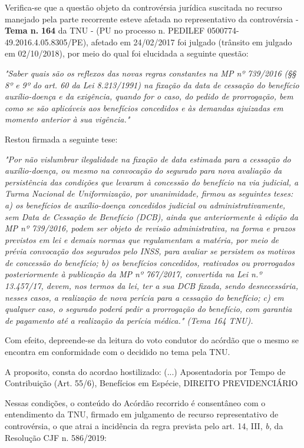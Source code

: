 \documentclass[12pt]{article}
\begin{document}
\justifying
\noindent Verifica-se que a questão objeto da controvérsia jurídica suscitada no recurso manejado pela parte recorrente esteve afetada no representativo da controvérsia - \textbf{Tema n. }\textbf{164} da TNU - (PU no processo n. PEDILEF 0500774-49.2016.4.05.8305/PE),  afetado em 24/02/2017 foi julgado (trânsito em julgado em 02/10/2018), por meio do qual foi elucidada a seguinte questão:

\noindent \textit{"Saber quais são os reflexos das novas regras constantes na MP nº 739/2016 (§§ 8º e 9º do art. 60 da Lei 8.213/1991) na fixação da data de cessação do benefício auxílio-doença e da exigência, quando for o caso, do pedido de prorrogação, bem como se são aplicáveis aos benefícios concedidos e às demandas ajuizadas em momento anterior à sua vigência."}

\noindent Restou firmada a seguinte tese:

\noindent \textit{"Por não vislumbrar ilegalidade na fixação de data estimada para a cessação do auxílio-doença, ou mesmo na convocação do segurado para nova avaliação da persistência das condições que levaram à concessão do benefício na via judicial, a Turma Nacional de Uniformização, por unanimidade, firmou as seguintes teses: a) os benefícios de auxílio-doença concedidos judicial ou administrativamente, sem Data de Cessação de Benefício (DCB), ainda que anteriormente à edição da MP nº 739/2016, podem ser objeto de revisão administrativa, na forma e prazos previstos em lei e demais normas que regulamentam a matéria, por meio de prévia convocação dos segurados pelo INSS, para avaliar se persistem os motivos de concessão do benefício; b) os benefícios concedidos, reativados ou prorrogados posteriormente à publicação da MP nº 767/2017, convertida na Lei n.º 13.457/17, devem, nos termos da lei, ter a sua DCB fixada, sendo desnecessária, nesses casos, a realização de nova perícia para a cessação do benefício; c) em qualquer caso, o segurado poderá pedir a prorrogação do benefício, com garantia de pagamento até a realização da perícia médica." (Tema 164 TNU).}

\noindent Com efeito, depreende-se da leitura do voto condutor do acórdão que o mesmo se encontra em conformidade com o decidido no  tema pela TNU.

\noindent A proposito, consta do acordao hostilizado: (...) Aposentadoria por Tempo de Contribuição (Art. 55/6), Benefícios em Espécie, DIREITO PREVIDENCIÁRIO

\noindent Nessas condições, o conteúdo do Acórdão recorrido é consentâneo com o entendimento da TNU, firmado em julgamento de recurso representativo de controvérsia, o que atrai a incidência da regra prevista pelo art. 14, III, \textit{b,} da Resolução CJF n. 586/2019:
\end{document}
